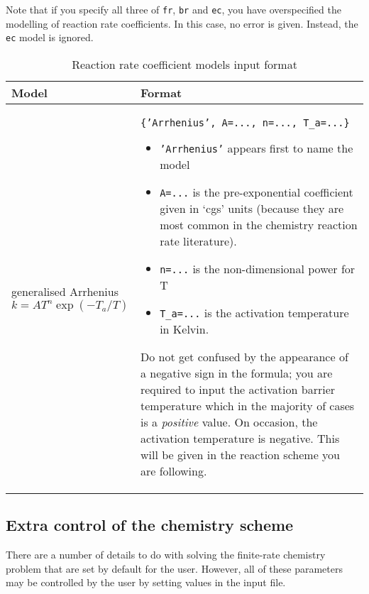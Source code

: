 Note that if you specify all three of \texttt{fr}, \texttt{br} and
\texttt{ec}, you have overspecified the modelling of
reaction rate coefficients.
In this case, no error is given.
Instead, the \texttt{ec} model is ignored.

\begin{table}
\begin{center}
 \caption{Reaction rate coefficient models input format}
 \label{tab:rr_coeffs}
\begin{tabular}{|p{5cm}|p{9cm}|}
\hline \hline 
Model & Format \\ \hline
generalised Arrhenius
\[ k = A T^n \exp(-T_a/T) \]
 & \texttt{\{'Arrhenius', A=..., n=..., T\_a=...\}}
                         \begin{itemize}
                          \item \texttt{'Arrhenius'} appears first to name the model
                          \item \texttt{A=...} is the pre-exponential coefficient given 
                                               in `cgs' units (because they are most common
                                               in the chemistry reaction rate literature).
                          \item \texttt{n=...} is the non-dimensional power for T
                          \item \texttt{T\_a=...} is the activation temperature in Kelvin.
                         \end{itemize}
                         Do not get confused by the appearance of a negative sign in the 
                         formula; you are required to input the activation barrier temperature
                         which in the majority of cases is a \emph{positive} value.
                         On occasion, the activation temperature is negative.
                         This will be given in the reaction scheme you are following.
      \\ \hline
\end{tabular}
\end{center}
\end{table}

\subsection{Extra control of the chemistry scheme}
There are a number of details to do with solving the finite-rate chemistry
problem that are set by default for the user.
However, all of these parameters may be controlled by the user by setting values in the input file.

